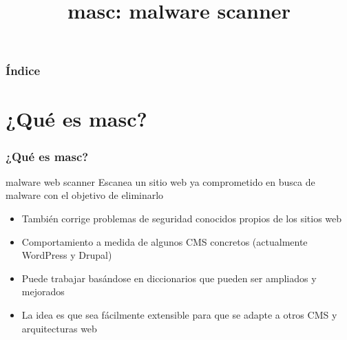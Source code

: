 \documentclass[xcolor={dvipsnames}]{beamer}
\begin{document}
\title{masc: malware scanner}


\begin{frame}
\titlepage
\end{frame}

\begin{frame}\frametitle{Índice}\tableofcontents
\end{frame} 


\section{¿Qué es masc?}
\begin{frame}\frametitle{¿Qué es masc?}

    \begin{block}{malware web scanner}
    Escanea un sitio web ya comprometido en busca de malware con el objetivo de eliminarlo
    \end{block}

    \begin{itemize}
        \item También corrige problemas de seguridad conocidos propios de los sitios web
        \item Comportamiento a medida de algunos CMS concretos (actualmente WordPress y Drupal)
        \item Puede trabajar basándose en diccionarios que pueden ser ampliados y mejorados
        \item La idea es que sea fácilmente extensible para que se adapte a otros CMS y arquitecturas web
    \end{itemize}
\end{frame}
\end{document}
